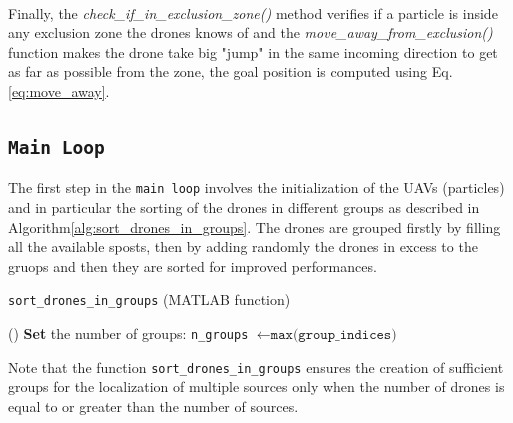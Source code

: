 \noindent\\
Finally, the
\textit{check\_if\_in\_exclusion\_zone()} 
method verifies if a particle is inside any 
exclusion zone the drones knows of and  
the \textit{move\_away\_from\_exclusion()} function
makes the drone take  big "jump" in the same incoming direction
to get as far as possible from the zone, the goal 
position is computed using Eq.\ref{eq:move_away}.

\subsection{\texttt{Main Loop}}
The first step in the \texttt{main loop} involves the initialization
of the UAVs (particles) and in particular the sorting of 
the drones in different groups as described in Algorithm\ref{alg:sort_drones_in_groups}.
The drones are grouped firstly by filling 
all the available sposts, then by adding randomly the drones in excess
to the gruops and then they are sorted for improved performances.

\begin{algorithm}[h]
    \caption{\texttt{sort\_drones\_in\_groups} (MATLAB function)}\label{alg:sort_drones_in_groups}
    \vspace{0.3\baselineskip}
    \nonl \Fn(\tcc*[h]{}){}{
    \SetAlgoBlockMarkers{}{}
    \textbf{Set} the number of groups: \texttt{n\_groups} $\gets \texttt{max(group\_indices)}$\;
    }
\end{algorithm}

\noindent Note that the function \texttt{sort\_drones\_in\_groups} ensures the creation of sufficient groups 
for the localization of multiple sources only when the number of drones is equal to or greater than 
the number of sources.

